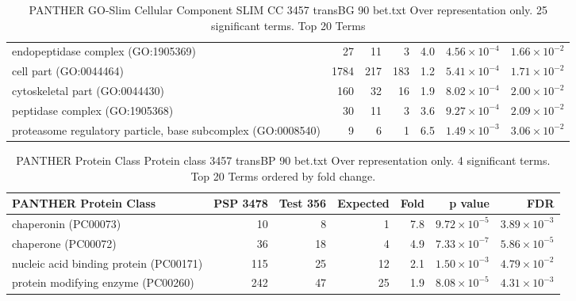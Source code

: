 \begin{table}[ht]
\begin{adjustbox}{width=\textwidth}
\begin{tabular}{lrrrrrr}
  endopeptidase complex (GO:1905369) & 27 & 11 & 3 & 4.0 & $4.56 \times 10^{-4}$ & $1.66 \times 10^{-2}$ \\ 
  cell part (GO:0044464) & 1784 & 217 & 183 & 1.2 & $5.41 \times 10^{-4}$ & $1.71 \times 10^{-2}$ \\ 
  cytoskeletal part (GO:0044430) & 160 & 32 & 16 & 1.9 & $8.02 \times 10^{-4}$ & $2.00 \times 10^{-2}$ \\ 
  peptidase complex (GO:1905368) & 30 & 11 & 3 & 3.6 & $9.27 \times 10^{-4}$ & $2.09 \times 10^{-2}$ \\ 
  proteasome regulatory particle, base subcomplex (GO:0008540) & 9 & 6 & 1 & 6.5 & $1.49 \times 10^{-3}$ & $3.06 \times 10^{-2}$ \\ 
   \hline
\end{tabular}
\end{adjustbox}
\caption{PANTHER GO-Slim Cellular Component SLIM CC 3457 transBG 90 bet.txt Over representation only. 25 significant terms. Top 20 Terms} 
\label{tab:PANTHER GO-Slim Cellular Component SLIM CC 3457 transBG 90 bet.txt Over representation only. 25 significant terms. Top 20 Terms}
\end{table}


\begin{table}[ht]
\centering
\begin{adjustbox}{width=\textwidth}
\begin{tabular}{lrrrrrr}
  \hline
PANTHER Protein Class & PSP 3478 & Test 356 & Expected & Fold & p value & FDR \\ 
  \hline
chaperonin (PC00073) & 10 & 8 & 1 & 7.8 & $9.72 \times 10^{-5}$ & $3.89 \times 10^{-3}$ \\ 
  chaperone (PC00072) & 36 & 18 & 4 & 4.9 & $7.33 \times 10^{-7}$ & $5.86 \times 10^{-5}$ \\ 
  nucleic acid binding protein (PC00171) & 115 & 25 & 12 & 2.1 & $1.50 \times 10^{-3}$ & $4.79 \times 10^{-2}$ \\ 
  protein modifying enzyme (PC00260) & 242 & 47 & 25 & 1.9 & $8.08 \times 10^{-5}$ & $4.31 \times 10^{-3}$ \\ 
   \hline
\end{tabular}
\end{adjustbox}
\caption{PANTHER Protein Class Protein class 3457 transBP 90 bet.txt Over representation only. 4 significant terms. Top 20 Terms ordered by fold change. } 
\label{tab:PANTHER Protein Class Protein class 3457 transBP 90 bet.txt Over representation only. 4 significant terms. Top 20 Terms ordered by fold change. }
\end{table}


